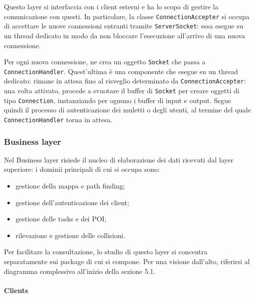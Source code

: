 Questo layer si interfaccia con i client esterni e ha lo scopo di gestire la comunicazione con questi. In particolare, la classe \texttt{ConnectionAccepter} si occupa di accettare le nuove connessioni entranti tramite \texttt{ServerSocket}: essa esegue su un thread dedicato in modo da non bloccare l'esecuzione all'arrivo di una nuova connessione. 

Per ogni nuova connessione, ne crea un oggetto \texttt{Socket} che passa a \texttt{ConnectionHandler}. Quest'ultima è una componente che esegue su un thread dedicato: rimane in attesa fino al risveglio determinato da \texttt{ConnectionAccepter}: una volta attivato, procede a svuotare il buffer di \texttt{Socket} per creare oggetti di tipo \texttt{Connection}, instanziando per ognuno i buffer di input e output. Segue quindi il processo di autenticazione dei muletti o degli utenti, al termine del quale \texttt{ConnectionHandler} torna in attesa.







\subsubsection{Business layer}

Nel Business layer risiede il nucleo di elaborazione dei dati ricevuti dal layer superiore: i dominii principali di cui si occupa sono:
\begin{itemize}
	\item gestione della mappa e path finding;
	\item gestione dell'autenticazione dei client;
	\item gestione delle tasks e dei POI;
	\item rilevazione e gestione delle collisioni.
\end{itemize}  
Per facilitare la consultazione, lo studio di questo layer si concentra separatamente sui package di cui si compone. Per una visione dall'alto, riferirsi al diagramma complessivo all'inizio della sezione 5.1.




\paragraph{Clients}
\subparagraph*{ }

